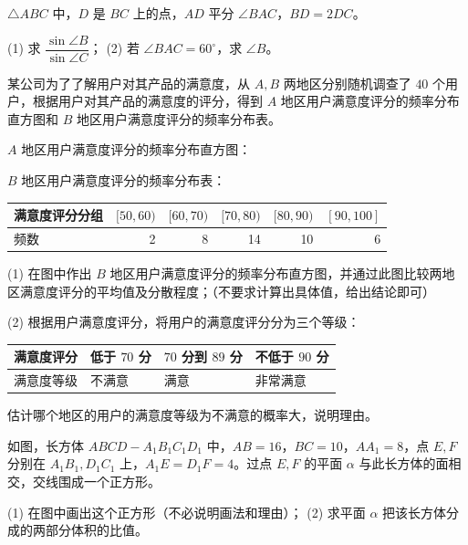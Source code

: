 \begin{question}
$\triangle ABC$ 中，$D$ 是 $BC$ 上的点，$AD$ 平分 $\angle BAC$，$BD=2DC$。

(1) 求 $\dfrac{\sin\angle B}{\sin\angle C}$；  
(2) 若 $\angle BAC=60^\circ$，求 $\angle B$。

\Needspace{0.4\textheight}
\end{question}
\begin{question}
某公司为了了解用户对其产品的满意度，从 $A,B$ 两地区分别随机调查了 $40$ 个用户，根据用户对其产品的满意度的评分，得到 $A$ 地区用户满意度评分的频率分布直方图和 $B$ 地区用户满意度评分的频率分布表。

$A$ 地区用户满意度评分的频率分布直方图：
\nopagebreak[4]
\begin{center}\end{center}
\nopagebreak[4]
$B$ 地区用户满意度评分的频率分布表：

\begin{center}
\begin{tabular}{lrrrrr}
\toprule
满意度评分分组 & $[50,60)$ & $[60,70)$ & $[70,80)$ & $[80,90)$ & $[90,100]$ \\
\midrule
频数 & 2 & 8 & 14 & 10 & 6 \\
\bottomrule
\end{tabular}
\end{center}

(1) 在图中作出 $B$ 地区用户满意度评分的频率分布直方图，并通过此图比较两地区满意度评分的平均值及分散程度；（不要求计算出具体值，给出结论即可）
\nopagebreak[4]
\begin{center}\end{center}
\nopagebreak[4]
(2) 根据用户满意度评分，将用户的满意度评分分为三个等级：

\begin{center}
\begin{tabular}{llll}
\toprule
满意度评分 & 低于 $70$ 分 & $70$ 分到 $89$ 分 & 不低于 $90$ 分 \\
\midrule
满意度等级 & 不满意 & 满意 & 非常满意 \\
\bottomrule
\end{tabular}
\end{center}

估计哪个地区的用户的满意度等级为不满意的概率大，说明理由。

\Needspace{0.4\textheight}
\end{question}
\begin{question}
如图，长方体 $ABCD-A_1B_1C_1D_1$ 中，$AB=16$，$BC=10$，$AA_1=8$，点 $E,F$ 分别在 $A_1B_1,D_1C_1$ 上，$A_1E=D_1F=4$。过点 $E,F$ 的平面 $\alpha$ 与此长方体的面相交，交线围成一个正方形。

(1) 在图中画出这个正方形（不必说明画法和理由）；  
(2) 求平面 $\alpha$ 把该长方体分成的两部分体积的比值。
\nopagebreak[4]
\begin{center}\end{center}
\nopagebreak[4]
\end{question}
